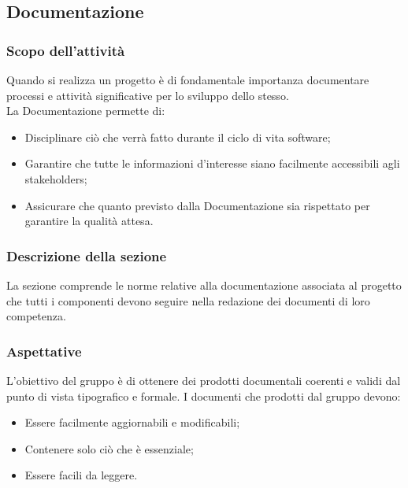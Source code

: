 \subsection{Documentazione}
\subsubsection{Scopo dell'attività} 
Quando si realizza un progetto è di fondamentale importanza documentare processi e attività significative per lo sviluppo dello stesso. \\
La Documentazione permette di:
\begin{itemize}
	\item Disciplinare ciò che verrà fatto durante il ciclo di vita software;
	\item Garantire che tutte le informazioni d'interesse siano facilmente accessibili agli stakeholders;
	\item Assicurare che quanto previsto dalla Documentazione sia rispettato per garantire la qualità attesa.
\end{itemize}

\subsubsection{Descrizione della sezione} 
La sezione comprende le norme relative alla documentazione associata al progetto che tutti i componenti devono seguire nella redazione dei documenti di loro competenza.

\subsubsection{Aspettative}
L'obiettivo del gruppo è di ottenere dei prodotti documentali coerenti e validi dal punto di vista tipografico e formale.
I documenti che prodotti dal gruppo devono:
\begin{itemize}
	\item Essere facilmente aggiornabili e modificabili;
	\item Contenere solo ciò che è essenziale;
	\item Essere facili da leggere.
\end{itemize}

